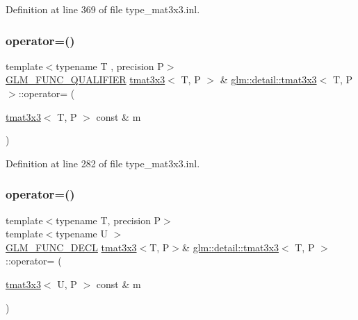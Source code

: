 Definition at line 369 of file type\+\_\+mat3x3.\+inl.

\mbox{\label{structglm_1_1detail_1_1tmat3x3_a7b73504291487e21519005578c6a900b}} 
\subsubsection{\texorpdfstring{operator=()}{operator=()}\hspace{0.1cm}{\footnotesize\ttfamily [1/3]}}
{\footnotesize\ttfamily template$<$typename T , precision P$>$ \\
\hyperlink{setup_8hpp_a33fdea6f91c5f834105f7415e2a64407}{G\+L\+M\+\_\+\+F\+U\+N\+C\+\_\+\+Q\+U\+A\+L\+I\+F\+I\+ER} \hyperlink{structglm_1_1detail_1_1tmat3x3}{tmat3x3}$<$ T, P $>$ \& \hyperlink{structglm_1_1detail_1_1tmat3x3}{glm\+::detail\+::tmat3x3}$<$ T, P $>$\+::operator= (\begin{DoxyParamCaption}\item[{\hyperlink{structglm_1_1detail_1_1tmat3x3}{tmat3x3}$<$ T, P $>$ const \&}]{m }\end{DoxyParamCaption})}



Definition at line 282 of file type\+\_\+mat3x3.\+inl.

\mbox{\label{structglm_1_1detail_1_1tmat3x3_a0b69c604eee9037a4b3ad45290e8d2ed}} 
\subsubsection{\texorpdfstring{operator=()}{operator=()}\hspace{0.1cm}{\footnotesize\ttfamily [2/3]}}
{\footnotesize\ttfamily template$<$typename T, precision P$>$ \\
template$<$typename U $>$ \\
\hyperlink{setup_8hpp_ab2d052de21a70539923e9bcbf6e83a51}{G\+L\+M\+\_\+\+F\+U\+N\+C\+\_\+\+D\+E\+CL} \hyperlink{structglm_1_1detail_1_1tmat3x3}{tmat3x3}$<$T, P$>$\& \hyperlink{structglm_1_1detail_1_1tmat3x3}{glm\+::detail\+::tmat3x3}$<$ T, P $>$\+::operator= (\begin{DoxyParamCaption}\item[{\hyperlink{structglm_1_1detail_1_1tmat3x3}{tmat3x3}$<$ U, P $>$ const \&}]{m }\end{DoxyParamCaption})}

